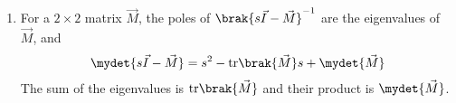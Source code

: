 \begin{enumerate}[label=\thesubsection.\arabic*, ref=\thesubsection.\theenumi]
\begin{align}
	\vec{X}\brak{s} = \brak{s\vec{I} - \vec{M}}^{-1}\vec{x}_0
	\label{eq:EE26BTECH11229-laplace-system}
\end{align}
\solution
Taking the Laplace transform of each row and using \eqref{eq:EE26BTECH11229-laplace-deriv},
\begin{align}
	s\vec{X}\brak{s} - \vec{x}_0 = \vec{M}\vec{X}\brak{s}
	\implies \brak{s\vec{I} - \vec{M}}\vec{X}\brak{s} = \vec{x}_0
\end{align}
\item For a $2 \times 2$ matrix $\vec{M}$, the poles of $\brak{s\vec{I} - \vec{M}}^{-1}$ are the eigenvalues of $\vec{M}$, and
\begin{align}
	\mydet{s\vec{I} - \vec{M}} = s^2 - \text{tr}\brak{\vec{M}}s + \mydet{\vec{M}}
	\label{eq:EE26BTECH11229-char-poly}
\end{align}
The sum of the eigenvalues is $\text{tr}\brak{\vec{M}}$ and their product is $\mydet{\vec{M}}$.
\end{enumerate}
